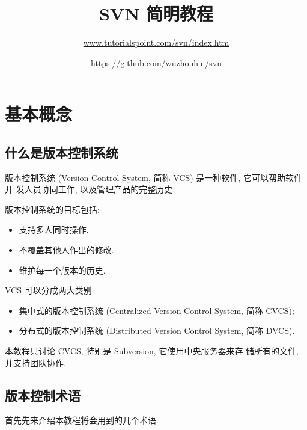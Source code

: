 \documentclass[nofonts, oneside]{ctexbook}
\title{SVN 简明教程}
\author{\url{www.tutorialspoint.com/svn/index.htm} \and
	\url{https://github.com/wuzhouhui/svn}}
\begin{document}
\maketitle

\tableofcontents

\chapter{基本概念}
\label{chap:basic_concepts}

\section{什么是版本控制系统}
\label{sec:what_is_version_control_system}

版本控制系统 (Version Control System, 简称 VCS) 是一种软件, 它可以帮助软件开
发人员协同工作, 以及管理产品的完整历史.

版本控制系统的目标包括:
\begin{itemize}
  \item 支持多人同时操作.
  \item 不覆盖其他人作出的修改.
  \item 维护每一个版本的历史.
\end{itemize}

VCS 可以分成两大类别:
\begin{itemize}
  \item 集中式的版本控制系统 (Centralized Version Control System, 简称 CVCS);
  \item 分布式的版本控制系统 (Distributed Version Control System, 简称 DVCS).
\end{itemize}

本教程只讨论 CVCS, 特别是 Subversion, 它使用中央服务器来存
储所有的文件, 并支持团队协作.

\section{版本控制术语}
\label{sec:version_control_terminologies}

首先先来介绍本教程将会用到的几个术语.
\end{document}
